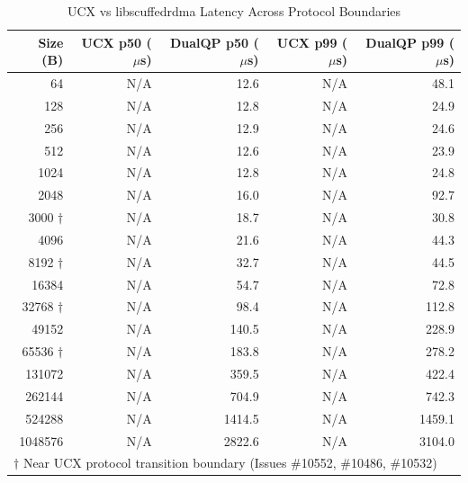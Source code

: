 \begin{table}[h]
\centering
\caption{UCX vs libscuffedrdma Latency Across Protocol Boundaries}
\label{tab:ucx_comparison}
\begin{tabular}{rrrrr}
\toprule
Size (B) & UCX p50 ($\mu$s) & DualQP p50 ($\mu$s) & UCX p99 ($\mu$s) & DualQP p99 ($\mu$s) \\
\midrule
        64 & N/A & 12.6 & N/A & 48.1 \\
       128 & N/A & 12.8 & N/A & 24.9 \\
       256 & N/A & 12.9 & N/A & 24.6 \\
       512 & N/A & 12.6 & N/A & 23.9 \\
      1024 & N/A & 12.8 & N/A & 24.8 \\
      2048 & N/A & 16.0 & N/A & 92.7 \\
      3000 $\dag$ & N/A & 18.7 & N/A & 30.8 \\
      4096 & N/A & 21.6 & N/A & 44.3 \\
      8192 $\dag$ & N/A & 32.7 & N/A & 44.5 \\
     16384 & N/A & 54.7 & N/A & 72.8 \\
     32768 $\dag$ & N/A & 98.4 & N/A & 112.8 \\
     49152 & N/A & 140.5 & N/A & 228.9 \\
     65536 $\dag$ & N/A & 183.8 & N/A & 278.2 \\
    131072 & N/A & 359.5 & N/A & 422.4 \\
    262144 & N/A & 704.9 & N/A & 742.3 \\
    524288 & N/A & 1414.5 & N/A & 1459.1 \\
   1048576 & N/A & 2822.6 & N/A & 3104.0 \\
\bottomrule
\multicolumn{5}{l}{\footnotesize $\dag$ Near UCX protocol transition boundary (Issues \#10552, \#10486, \#10532)} \\
\end{tabular}
\end{table}